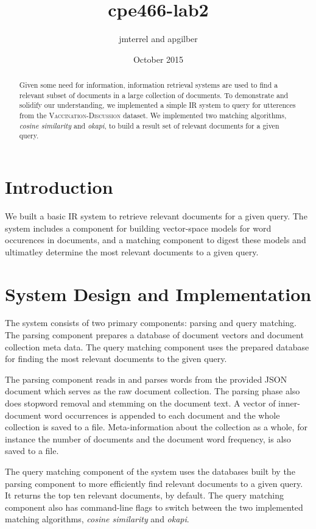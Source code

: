 \documentclass{report}
\title{cpe466-lab2}
\author{jmterrel and apgilber}
\date{October 2015}
\begin{document}
\maketitle

\begin{abstract}
Given some need for information, information retrieval systems are
used to find a relevant subset of documents in a large collection of
documents. To demonstrate and solidify our understanding, we
implemented a simple IR system to query for utterences from the
\textsc{Vaccination-Discussion} dataset. We implemented two matching
algorithms, \textit{cosine similarity} and \textit{okapi}, to build a
result set of relevant documents for a given query.
\end{abstract}

\section{Introduction}
We built a basic IR system to retrieve relevant documents for a given
query. The system includes a component for building vector-space
models for word occurences in documents, and a matching component to
digest these models and ultimatley determine the most relevant
documents to a given query.

\section{System Design and Implementation}
The system consists of two primary components: parsing and query
matching. The parsing component prepares a database of document
vectors and document collection meta data. The query matching
component uses the prepared database for finding the most relevant
documents to the given query.

The parsing component reads in and parses words from the provided JSON
document which serves as the raw document collection. The parsing
phase also does stopword removal and stemming on the document text. A
vector of inner-document word occurrences is appended to each document
and the whole collection is saved to a file. Meta-information
about the collection as a whole, for instance the number of documents
and the document word frequency, is also saved to a file.

The query matching component of the system uses the databases built by
the parsing component to more efficiently find relevant documents to a
given query. It returns the top ten relevant documents, by
default. The query matching component also has command-line flags to
switch between the two implemented matching algorithms, \textit{cosine
similarity} and \textit{okapi}.
\end{document}
